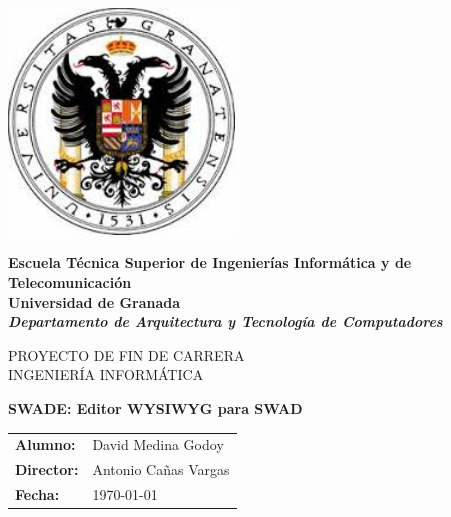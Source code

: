 %
%

%

\begin{titlepage}

	\begin{center}

		\includegraphics[width=6cm]{fig/logo_ugr}
		\vspace{2cm}

		{\Large{\textbf{Escuela Técnica Superior de Ingenierías Informática y de Telecomunicación}}}
                \\
                {\Large{\textbf{Universidad de Granada}}}
		\\
		{\it \large{\textbf{Departamento de Arquitectura y Tecnología de Computadores}}}
		\vspace{1cm}

		{\large PROYECTO DE FIN DE CARRERA\\INGENIERÍA INFORMÁTICA}
		\vspace{1cm}

		\textbf{\Large SWADE: Editor WYSIWYG para SWAD}
		\vspace{7cm}
	\end{center}

	\begin{flushright}
		\begin{tabular}{ll}
			\large{\textbf{Alumno:}}	&
			\large{David Medina Godoy} \\

			\large{\textbf{Director:}}	&
			\large{Antonio Cañas Vargas} \\

			\large{\textbf{Fecha:}}	&
			\large{\today} \\
		\end{tabular}
	\end{flushright}

\end{titlepage}
